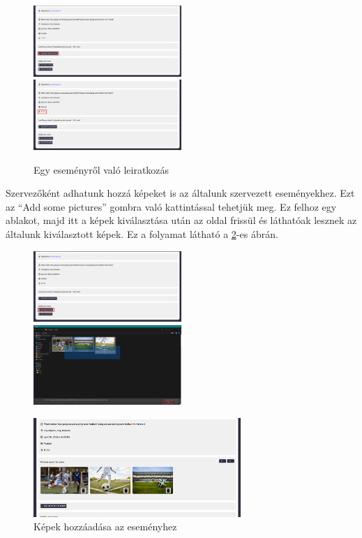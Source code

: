 \begin{figure}[h]
	\includegraphics[width=0.5\textwidth]{images/resign_from_event_1.png}
	\includegraphics[width=0.5\textwidth]{images/resign_from_event_2.png}
	\caption{Egy eseményről való leiratkozás}
	\label{fig:resign_from_event}
\end{figure}

Szervezőként adhatunk hozzá képeket is az általunk szervezett eseményekhez. Ezt az ``Add some pictures'' gombra való kattintással tehetjük meg.
Ez felhoz egy ablakot, majd itt a képek kiválasztása után az oldal frissül és láthatóak lesznek az általunk kiválasztott képek. Ez a folyamat
látható a \ref{fig:add_pictures_event}-es ábrán.

\begin{figure}[ht]
	\includegraphics[width=0.5\textwidth]{images/add_pictures_event.png}
	\includegraphics[width=0.5\textwidth]{images/add_pictures_event_2.png}
	\begin{center}
		\includegraphics[width=0.7\textwidth]{images/add_pictures_event_3.png}
	\end{center}
	\caption{Képek hozzáadása az eseményhez}
	\label{fig:add_pictures_event}
\end{figure}

